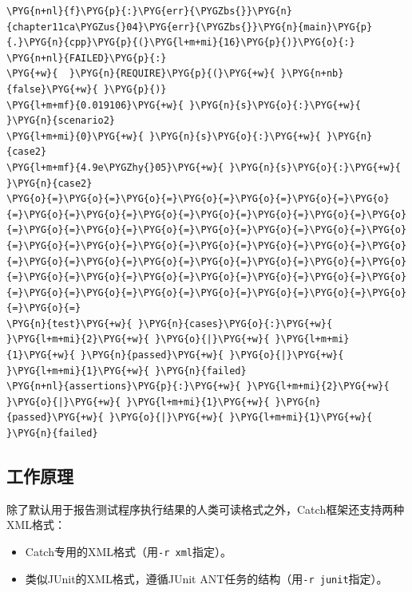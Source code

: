 \begin{itemize}
\begin{codeblockbg}
\begin{Verbatim}[commandchars=\\\{\},breaklines=true,breakanywhere=true,fontsize=\codefont,xleftmargin=17bp]
\PYG{n+nl}{f}\PYG{p}{:}\PYG{err}{\PYGZbs{}}\PYG{n}{chapter11ca\PYGZus{}04}\PYG{err}{\PYGZbs{}}\PYG{n}{main}\PYG{p}{.}\PYG{n}{cpp}\PYG{p}{(}\PYG{l+m+mi}{16}\PYG{p}{)}\PYG{o}{:}
\PYG{n+nl}{FAILED}\PYG{p}{:}
\PYG{+w}{  }\PYG{n}{REQUIRE}\PYG{p}{(}\PYG{+w}{ }\PYG{n+nb}{false}\PYG{+w}{ }\PYG{p}{)}
\PYG{l+m+mf}{0.019106}\PYG{+w}{ }\PYG{n}{s}\PYG{o}{:}\PYG{+w}{ }\PYG{n}{scenario2}
\PYG{l+m+mi}{0}\PYG{+w}{ }\PYG{n}{s}\PYG{o}{:}\PYG{+w}{ }\PYG{n}{case2}
\PYG{l+m+mf}{4.9e\PYGZhy{}05}\PYG{+w}{ }\PYG{n}{s}\PYG{o}{:}\PYG{+w}{ }\PYG{n}{case2}
\PYG{o}{=}\PYG{o}{=}\PYG{o}{=}\PYG{o}{=}\PYG{o}{=}\PYG{o}{=}\PYG{o}{=}\PYG{o}{=}\PYG{o}{=}\PYG{o}{=}\PYG{o}{=}\PYG{o}{=}\PYG{o}{=}\PYG{o}{=}\PYG{o}{=}\PYG{o}{=}\PYG{o}{=}\PYG{o}{=}\PYG{o}{=}\PYG{o}{=}\PYG{o}{=}\PYG{o}{=}\PYG{o}{=}\PYG{o}{=}\PYG{o}{=}\PYG{o}{=}\PYG{o}{=}\PYG{o}{=}\PYG{o}{=}\PYG{o}{=}\PYG{o}{=}\PYG{o}{=}\PYG{o}{=}\PYG{o}{=}\PYG{o}{=}\PYG{o}{=}\PYG{o}{=}\PYG{o}{=}\PYG{o}{=}\PYG{o}{=}\PYG{o}{=}\PYG{o}{=}\PYG{o}{=}\PYG{o}{=}\PYG{o}{=}\PYG{o}{=}\PYG{o}{=}\PYG{o}{=}\PYG{o}{=}\PYG{o}{=}
\PYG{n}{test}\PYG{+w}{ }\PYG{n}{cases}\PYG{o}{:}\PYG{+w}{ }\PYG{l+m+mi}{2}\PYG{+w}{ }\PYG{o}{|}\PYG{+w}{ }\PYG{l+m+mi}{1}\PYG{+w}{ }\PYG{n}{passed}\PYG{+w}{ }\PYG{o}{|}\PYG{+w}{ }\PYG{l+m+mi}{1}\PYG{+w}{ }\PYG{n}{failed}
\PYG{n+nl}{assertions}\PYG{p}{:}\PYG{+w}{ }\PYG{l+m+mi}{2}\PYG{+w}{ }\PYG{o}{|}\PYG{+w}{ }\PYG{l+m+mi}{1}\PYG{+w}{ }\PYG{n}{passed}\PYG{+w}{ }\PYG{o}{|}\PYG{+w}{ }\PYG{l+m+mi}{1}\PYG{+w}{ }\PYG{n}{failed}
\end{Verbatim}
\end{codeblockbg}

\end{itemize}



\subsection{工作原理}



除了默认用于报告测试程序执行结果的人类可读格式之外，Catch框架还支持两种XML格式：



\begin{itemize}
\item Catch专用的XML格式（用\texttt{-\allowbreak{}r xml}指定）。



\item 类似JUnit的XML格式，遵循JUnit ANT任务的结构（用\texttt{-\allowbreak{}r junit}指定）。

\end{itemize}


